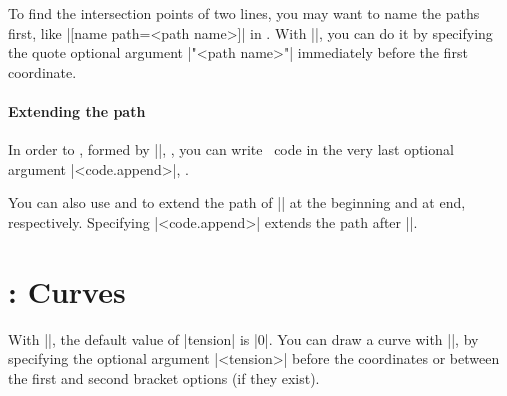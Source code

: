 To find the intersection points of two lines, you may want to name the paths first, like |[name path=<path name>]| in \Tikz. With |\tzplot|, you can do it by specifying the quote optional argument |"<path name>"| immediately before the first coordinate.

\begin{tzcode}{.3}
\end{tzcode}

\paragraph{Extending the path}
In order to , formed by |\tzplot|, , you can write \Tikz\ code in the very last optional argument |<code.append>|, .

\begin{tzcode}{.3}
\end{tzcode}

You can also use \icmd{\tzplotAtBegin} and \icmd{\tzplotAtEnd} to extend the path of |\tzplot| at the beginning and at end, respectively. Specifying |<code.append>| extends the path after |\tzploAtEnd|.


\section{\protect\cmd{\tzplot}: Curves}
\label{s:tzplot:curves}

With |\tzplot|, the default value of |tension| is |0|.
You can draw a curve with |\tzplot|, by specifying the optional argument |{<tension>}| before the coordinates or between the first and second bracket options (if they exist).

